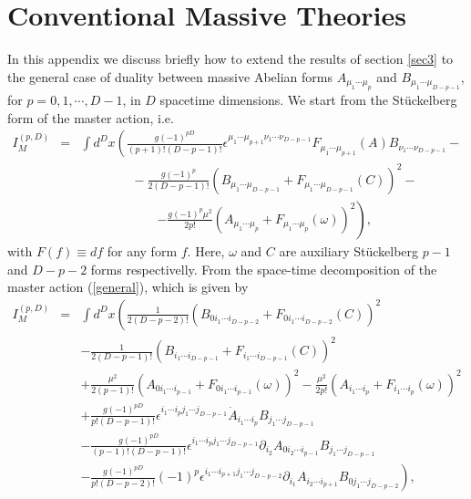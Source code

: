 \documentclass[a4paper,12pt]{article}
\newcommand{\eref}[1]{(\ref{#1})}
\renewcommand{\sup}[1]{^{(#1)}}
\begin{document}
\section{Conventional Massive Theories}\label{Ap-A}
In this appendix we discuss briefly how to extend the results of
section \ref{sec3} to the general case of duality between massive
Abelian forms $A_{\mu_1\cdots\mu_p}$ and
$B_{\mu_1\cdots\mu_{D-p-1}}$, for $p=0,1,\cdots,D-1$, in $D$
spacetime dimensions. We start from the St\"uckelberg form of the
master action, i.e.
\begin{eqnarray}
I_M\sup{p,D}&=&\int d^Dx\left(\frac{g(-1)^{pD}}{(p+1)!(D-p-1)!}\epsilon^{\mu_1\cdots\mu_{p+1}\nu_1
\cdots\nu_{D-p-1}}F_{\mu_1\cdots\mu_{p+1}}(A)B_{\nu_1\cdots\nu_{D-p-1}} -\right.\nonumber\\
&&\qquad\qquad-\frac{g(-1)^p}{2(D-p-1)!}(B_{\mu_1\cdots\mu_{D-p-1}}+
F_{\mu_1\cdots\mu_{D-p-1}}(C))^2 -\nonumber\\
&&\qquad\qquad\qquad\left.-\frac{g(-1)^p\mu^2}{2p!}(A_{\mu_1\cdots\mu_p}+
F_{\mu_1\cdots\mu_p}(\omega))^2\right),\label{general}
\end{eqnarray}
with $F(f) \equiv df$ for any form $f$. Here, $\omega$ and $C$
are auxiliary  St\"uckelberg $p-1$ and $D-p-2$ forms
respectivelly. From the  space-time decomposition of the master
action \eref{general}, which is  given by
\begin{eqnarray}
I_M\sup{p,D}&=&\int d^Dx\left({\frac 1{2(D-p-2)!}}
(B_{0i_1\cdots i_{D-p-2}}+
F_{0i_1\cdots i_{D-p-2}}(C))^2\right.\nonumber\\
             &&-{\frac 1{2(D-p-1)!}}(B_{i_1\cdots i_{D-p-1}}+
F_{i_1\cdots i_{D-p-1}}(C))^2\nonumber\\
             &&+{\frac{\mu^2}{2(p-1)!}}
(A_{0i_1\cdots i_{p-1}}+
F_{0i_1\cdots i_{p-1}}(\omega))^2-{\frac{\mu^2}{2p!}}
(A_{i_1\cdots i_p}+F_{i_1\cdots i_p}(\omega))^2\nonumber\\
             &&+{\frac{g(-1)^{pD}}{p!(D-p-1)!}}
\epsilon^{i_1\cdots i_pj_1\cdots j_{D-p-1}}
\dot A_{i_1\cdots i_p}B_{j_1\cdots j_{D-p-1}}\nonumber\\
             &&-{\frac{g(-1)^{pD}}{(p-1)!(D-p-1)!}}
\epsilon^{i_1\cdots i_pj_1\cdots j_{D-p-1}}
\partial_{i_2} A_{0i_2\cdots i_{p-1}}B_{j_1\cdots j_{D-p-1}}\nonumber\\
             &&\left.-{\frac{g(-1)^{pD}}{p!(D-p-2)!}}(-1)^p
\epsilon^{i_1\cdots i_{p+1}j_1\cdots j_{D-p-2}}\partial_{i_1}
A_{i_2\cdots i_{p+1}}B_{0j_1\cdots j_{D-p-2}}\right),\nonumber\\
\end{eqnarray}
\end{document}
